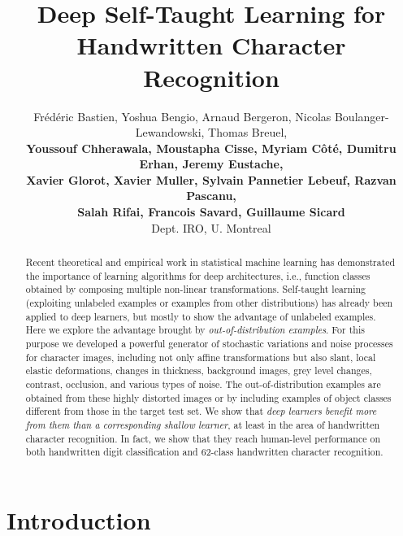 \documentclass{article} %
\title{Deep Self-Taught Learning for Handwritten Character Recognition}
\author{
Frédéric  Bastien, 
Yoshua  Bengio, 
Arnaud  Bergeron, 
Nicolas  Boulanger-Lewandowski,
Thomas  Breuel,\\ 
{\bf Youssouf  Chherawala, 
Moustapha  Cisse, 
Myriam  Côté, 
Dumitru  Erhan,
Jeremy  Eustache,}\\
{\bf Xavier  Glorot, 
Xavier  Muller,
Sylvain  Pannetier Lebeuf,
Razvan  Pascanu,} \\
{\bf Salah  Rifai, 
Francois  Savard, 
Guillaume  Sicard}\\
Dept. IRO, U. Montreal 
}
\begin{document}
\maketitle

\vspace*{-2mm}
\begin{abstract}
  Recent theoretical and empirical work in statistical machine learning has
  demonstrated the importance of learning algorithms for deep
  architectures, i.e., function classes obtained by composing multiple
  non-linear transformations. Self-taught learning (exploiting unlabeled
  examples or examples from other distributions) has already been applied
  to deep learners, but mostly to show the advantage of unlabeled
  examples. Here we explore the advantage brought by {\em out-of-distribution examples}.
For this purpose we
  developed a powerful generator of stochastic variations and noise
  processes for character images, including not only affine transformations
  but also slant, local elastic deformations, changes in thickness,
  background images, grey level changes, contrast, occlusion, and various
  types of noise. The out-of-distribution examples are obtained from these
  highly distorted images or by including examples of object classes
  different from those in the target test set.
  We show that {\em deep learners benefit
    more from them than a corresponding shallow learner}, at least in the area of
  handwritten character recognition. In fact, we show that they reach
  human-level performance on both handwritten digit classification and
  62-class handwritten character recognition.  
\end{abstract}
\vspace*{-3mm}

\section{Introduction}
\vspace*{-1mm}
\end{document}
